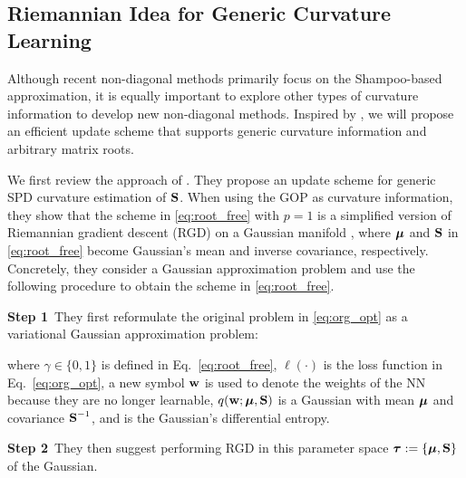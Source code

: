 \subsection{Riemannian Idea for Generic Curvature Learning}
\label{sec:rgd_approach}
\vspace{-0.1cm}
Although recent non-diagonal methods primarily focus on the Shampoo-based approximation, it is equally important to explore other types of curvature information to develop new non-diagonal methods. 
%
Inspired by \citet{lincan2024}, we will propose an efficient update scheme that supports generic curvature information and arbitrary matrix roots.

We first review the approach  of \citet{lincan2024}. They propose an update scheme for generic SPD  curvature estimation of $\mbox{$\mbox{$\mathbf{S}$}$}$. %
When using the GOP as curvature information, they show that the scheme in \eqref{eq:root_free} with $p=1$ is a simplified version of Riemannian gradient descent (RGD) on a Gaussian manifold \citep{amari2016information}, where $\mbox{$\mbox{$\boldsymbol{\mu}$}$}$ and $\mbox{$\mbox{$\mathbf{S}$}$}$ in \eqref{eq:root_free} become Gaussian's mean and inverse covariance, respectively.
Concretely, they consider a Gaussian approximation problem and use the following procedure to obtain the scheme in \eqref{eq:root_free}.

{\bf Step 1}\, They first reformulate the original problem in \eqref{eq:org_opt} as a variational Gaussian approximation problem:

\vspace{-0.35cm}

\vspace{-0.25cm}
where $\gamma \in \{0,1\}$ is defined in Eq.~\eqref{eq:root_free}, $\ell(\cdot)$ is the loss function in Eq.~\eqref{eq:org_opt},  a new symbol $\mbox{$\mbox{$\mathbf{w}$}$}$ is used to denote the weights of the NN   because they are no longer learnable,  $q(\mbox{$\mbox{$\mathbf{w}$}$};\mbox{$\mbox{$\boldsymbol{\mu}$}$},\mbox{$\mbox{$\mathbf{S}$}$})$ is a Gaussian with mean $\mbox{$\mbox{$\boldsymbol{\mu}$}$}$ and covariance $\mbox{$\mbox{$\mathbf{S}$}$}^{-1}$, and  is the Gaussian's differential entropy.


{\bf Step 2}\, They then suggest performing RGD in this  parameter space  $\mbox{$\mbox{$\boldsymbol{\tau}$}$}:=\{\mbox{$\mbox{$\boldsymbol{\mu}$}$},\mbox{$\mbox{$\mathbf{S}$}$}\}$ of the Gaussian.

